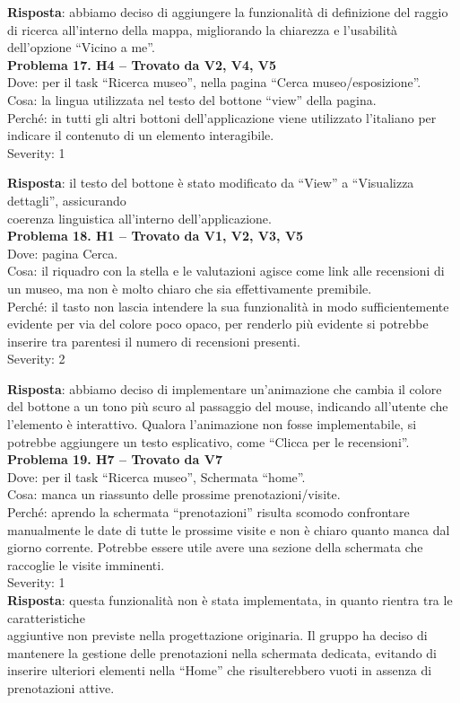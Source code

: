 \documentclass{article}
\begin{document}
\noindent \textbf{Risposta}: abbiamo deciso di aggiungere la funzionalità di definizione del raggio di ricerca all'interno della mappa, migliorando la chiarezza e l'usabilità dell’opzione “Vicino a me”.\\

\noindent \textbf{Problema 17. H4 – Trovato da V2, V4, V5} \\
Dove: per il task “Ricerca museo”, nella pagina “Cerca museo/esposizione”. \\
Cosa: la lingua utilizzata nel testo del bottone “view” della pagina. \\
Perché: in tutti gli altri bottoni dell’applicazione viene utilizzato l’italiano per indicare il contenuto di un elemento interagibile. \\
Severity: 1 

\noindent \textbf{Risposta}: il testo del bottone è stato modificato da “View” a “Visualizza dettagli”, assicurando \\ coerenza linguistica all’interno dell’applicazione.\\

\noindent \textbf{Problema 18. H1 – Trovato da V1, V2, V3, V5} \\
Dove: pagina Cerca. \\
Cosa: il riquadro con la stella e le valutazioni agisce come link alle recensioni di un museo, ma non è molto chiaro che sia effettivamente premibile. \\
Perché: il tasto non lascia intendere la sua funzionalità in modo sufficientemente evidente per via del colore poco opaco, per renderlo più evidente si potrebbe inserire tra parentesi il numero di recensioni presenti. \\
Severity: 2

\noindent \textbf{Risposta}: abbiamo deciso di implementare un'animazione che cambia il colore del bottone a un tono più scuro al passaggio del mouse, indicando all’utente che l’elemento è interattivo. Qualora l’animazione non fosse implementabile, si potrebbe aggiungere un testo esplicativo, come “Clicca per le recensioni”.\\

\noindent \textbf{Problema 19. H7 – Trovato da V7} \\
Dove: per il task “Ricerca museo”, Schermata “home”. \\
Cosa: manca un riassunto delle prossime prenotazioni/visite. \\
Perché: aprendo la schermata “prenotazioni” risulta scomodo confrontare manualmente le date di tutte le prossime visite e non è chiaro quanto manca dal giorno corrente. Potrebbe essere utile avere una sezione della schermata che raccoglie le visite imminenti. \\
Severity: 1 \\
\textbf{Risposta}: questa funzionalità non è stata implementata, in quanto rientra tra le caratteristiche\\ aggiuntive non previste nella progettazione originaria. Il gruppo ha deciso di mantenere la gestione delle prenotazioni nella schermata dedicata, evitando di inserire ulteriori elementi nella “Home” che risulterebbero vuoti in assenza di prenotazioni attive.\\
\end{document}
